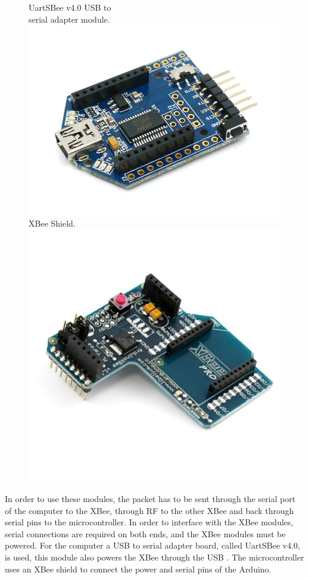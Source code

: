 \begin{figure}[H]
  \centering
  \captionbox
  {
    UartSBee v4.0 USB to\\ serial adapter module. \cite{UartSBee}
    \label{fig:UartSBee}
  }
  {
    \includegraphics[width=.37\textwidth]{figures/UartSBee}
  }
  \hspace{5pt}
  \captionbox
  {
    XBee Shield. \cite{XBeeShield}
    \label{fig:XbeeShield}
  }
  {
    \includegraphics[width=.37\textwidth]{figures/XbeeShield}
  }
\end{figure}
\vspace{-0.8 cm}
In order to use these modules, the packet has to be sent through the serial port of the computer to the XBee, through RF to the other XBee and back through serial pins to the microcontroller. In order to interface with the XBee modules, serial connections are required on both ends, and the XBee modules must be powered. For the computer a USB to serial adapter board, called UartSBee v4.0, is used, this module also powers the XBee through the USB \cite{UartSBeeSch}. The microcontroller uses an XBee shield to connect the power and serial pins of the Arduino\cite{XbeeShieldSch}.
\vspace{-0.5 cm}